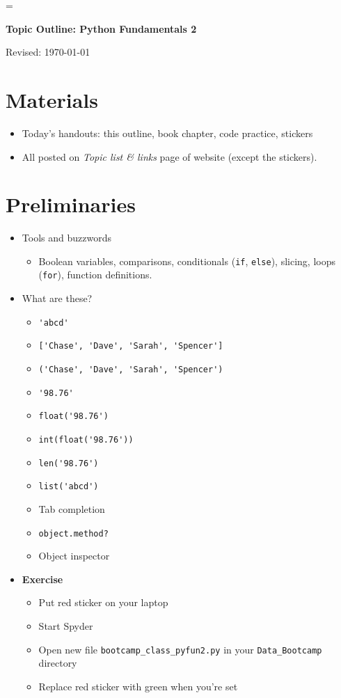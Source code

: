 \documentclass[11pt]{article}
\begin{document}
\parskip=\bigskipamount
\parindent=0.0in
\thispagestyle{empty}


\bigskip\bigskip
\centerline{\Large \bf Topic Outline:  Python Fundamentals 2}
\centerline{Revised: \today}


\section*{Materials}

\begin{itemize}
\item  Today's handouts:  this outline, book chapter, code practice, stickers
\item  All posted on {\it Topic list \& links\/} page of website (except the stickers).
\end{itemize}


\section*{Preliminaries}

\begin{itemize}

\item Tools and buzzwords
\begin{itemize}
\item Boolean variables, comparisons, conditionals ({\tt if}, {\tt else}), slicing,
loops ({\tt for}), function definitions.
\end{itemize}

\item What are these?
\begin{itemize}
\item \verb|'abcd' |
\item \verb|['Chase', 'Dave', 'Sarah', 'Spencer'] |
\item \verb|('Chase', 'Dave', 'Sarah', 'Spencer') |
\item \verb|'98.76'|
\item \verb|float('98.76')|
\item \verb|int(float('98.76'))|
\item \verb|len('98.76')|
\item \verb|list('abcd')|
\item Tab completion
\item {\tt object.method?} 
\item Object inspector
\end{itemize}

\item {\bf Exercise}
\begin{itemize}
\item Put red sticker on your laptop
\item Start Spyder
\item Open new file  \verb|bootcamp_class_pyfun2.py|
in your \verb|Data_Bootcamp| directory
\item Replace red sticker with green when you're set
\end{itemize}

\end{itemize}
\end{document}
